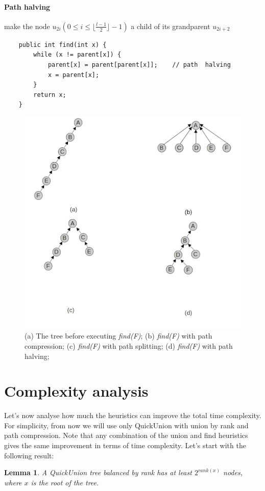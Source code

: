 \documentclass{article}
\newtheorem{lemma}{Lemma}
\begin{document}
\paragraph{Path halving} \cite{van1977alternative} \cite{van1980datastructures} make the node $u_{2i} ( 0 \leq i \leq \lfloor \frac{l-1}{2}\rfloor - 1)$ a child 
of its grandparent $u_{2i+2}$
\begin{lstlisting}
    public int find(int x) {
        while (x != parent[x]) {
            parent[x] = parent[parent[x]];    // path  halving
            x = parent[x];
        }
        return x;
    }
\end{lstlisting}
\begin{figure}[h!]
    \includegraphics[width = \linewidth]{img/pc.jpg}
    \caption{(a) The tree before executing \emph{find(F)};
    (b) \emph{find(F)} with path compression;
    (c) \emph{find(F)} with path splitting;
    (d) \emph{find(F)} with path halving;
    }
    \label{fig:pc}   
\end{figure}
\newpage
\section{Complexity analysis}\label{complex}
Let's now analyse how much the heuristics can improve the total time complexity. 
For simplicity, from now we will use only QuickUnion with union by rank 
and path compression. Note that any combination of  the union and find heuristics gives the same improvement in terms of time complexity. 
Let's start with the following result:
\begin{lemma}\label{rank}
    A QuickUnion tree balanced by rank has at least $2^{rank(x)}$ nodes, where $x$ is the root of the tree.
\end{lemma}
\end{document}
